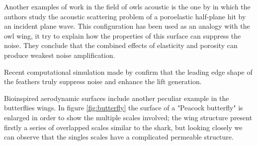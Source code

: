 Another examples of work in the field of owls acoustic is the one by \citet{jaworski2013aerodynamic} in which the authors study the acoustic scattering problem of a poroelastic half-plane hit by an incident plane wave.
This configuration has been used as an analogy with the owl wing, it try to explain how the properties of this surface can suppress the noise.
They conclude that the combined effects of elasticity and porosity can produce weakest noise amplification.

Recent computational simulation made by \citet{rao2017owl} confirm that the leading edge shape of the feathers truly suppress noise and enhance the lift generation.

Bioinspired aerodynamic surfaces include another peculiar example in the butterflies wings.
In figure \ref{fig:butterfly} the surface of a "Peacock butterfly" is enlarged in order to show the multiple scales involved; the wing structure present firstly a series of overlapped scales similar to the shark, but looking closely we can observe that the singles scales have a complicated permeable structure.

